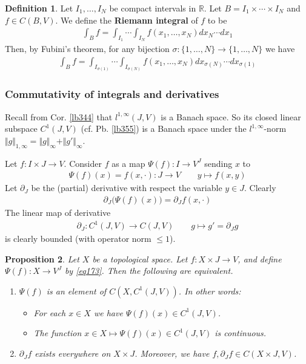 \documentclass[12pt,b5paper,notitlepage]{article}
\theoremstyle{definition}
\newtheorem{df}{Definition}[section]
\theoremstyle{plain}
\newtheorem{pp}[df]{Proposition}
\newcommand{\Rbb}{\mathbb R}
\numberwithin{equation}{section}
\begin{document}
\begin{df}\label{lb487}
Let $I_1,\dots,I_N$ be compact intervals in $\Rbb$. Let $B=I_1\times\cdots\times I_N$ and $f\in C(B,V)$. We define the \textbf{Riemann integral} of $f$ to be
\begin{align*}
\int_Bf=\int_{I_1}\cdots\int_{I_N}f(x_1,\dots,x_N)dx_N\cdots dx_1
\end{align*}
Then, by Fubini's theorem, for any bijection $\sigma:\{1,\dots,N\}\rightarrow\{1,\dots,N\}$ we have
\begin{align*}
\int_Bf=\int_{I_{\sigma(1)}}\cdots\int_{I_{\sigma(N)}}f(x_1,\dots,x_N)dx_{\sigma(N)}\cdots dx_{\sigma(1)}
\end{align*}
\end{df}


\subsubsection{Commutativity of integrals and derivatives}


Recall from Cor. \ref{lb344} that $l^{1,\infty}(J,V)$ is a Banach space. So its closed linear subspace $C^1(J,V)$ (cf. Pb. \ref{lb355}) is a Banach space under the $l^{1,\infty}$-norm $\Vert g\Vert_{1,\infty}=\Vert g\Vert_\infty+\Vert g'\Vert_\infty$.

Let $f:I\times J\rightarrow V$. Consider $f$ as a map $\Psi(f):I\rightarrow V^J$ sending $x$ to
\begin{align}
\Psi(f)(x)=f(x,\cdot):J\rightarrow V\qquad  y\mapsto f(x,y)  \label{eq173}
\end{align}
Let $\partial_J$ be the (partial) derivative with respect the variable $y\in J$. Clearly
\begin{align}
\partial_J\big(\Psi(f)(x)\big)=\partial_Jf(x,\cdot)
\end{align}
The linear map of derivative
\begin{align}
\partial_J:C^1(J,V)\rightarrow C(J,V)\qquad g\mapsto g'=\partial_Jg
\end{align}
is clearly bounded (with operator norm $\leq 1$).

\begin{pp}\label{lb402}
Let $X$ be a topological space. Let $f:X\times J\rightarrow V$, and define $\Psi(f):X\rightarrow V^J$ by \eqref{eq173}. Then the following are equivalent.
\begin{enumerate}[label=(\arabic*)]
\item $\Psi(f)$ is an element of $C(X,C^1(J,V))$. In other words:
\begin{itemize}
\item[(1a)] For each $x\in X$ we have $\Psi(f)(x)\in C^1(J,V)$.
\item[(1b)] The function $x\in X\mapsto \Psi(f)(x)\in C^1(J,V)$ is continuous.
\end{itemize}
\item $\partial_Jf$ exists everywhere on $X\times J$. Moreover, we have $f,\partial_Jf\in C(X\times J,V)$. 
\end{enumerate}
\end{pp}
\end{document}
